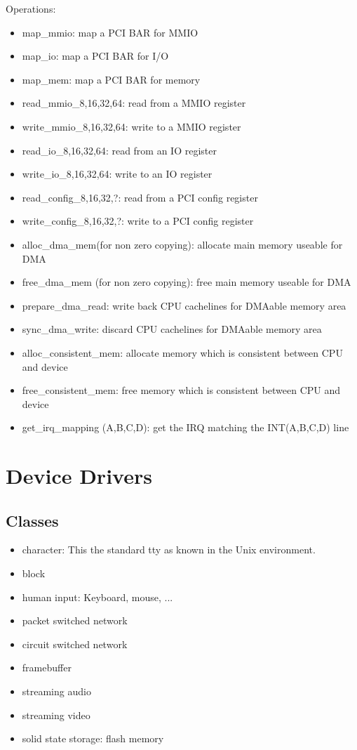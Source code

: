 Operations:
\begin{itemize}
\item map\_mmio: map a PCI BAR for MMIO
\item map\_io: map a PCI BAR for I/O
\item map\_mem: map a PCI BAR for memory
\item read\_mmio\_{8,16,32,64}: read from a MMIO register
\item write\_mmio\_{8,16,32,64}: write to a MMIO register
\item read\_io\_{8,16,32,64}: read from an IO register
\item write\_io\_{8,16,32,64}: write to an IO register
\item read\_config\_{8,16,32,?}: read from a PCI config register
\item write\_config\_{8,16,32,?}: write to a PCI config register
\item alloc\_dma\_mem(for non zero copying): allocate main memory 
  useable for DMA
\item free\_dma\_mem  (for non zero copying): free main memory 
  useable for DMA
\item prepare\_dma\_read: write back CPU cachelines for DMAable memory area
\item sync\_dma\_write: discard CPU cachelines for DMAable memory area
\item alloc\_consistent\_mem: allocate memory which is consistent 
  between CPU and device
\item free\_consistent\_mem: free memory which
  is consistent between CPU and device
\item get\_irq\_mapping (A,B,C,D): get the IRQ matching the 
  INT(A,B,C,D) line
\end{itemize}


\section{Device Drivers}

\subsection{Classes}

\begin{itemize}
\item character: This the standard tty as known in the Unix environment.
\item block
\item human input: Keyboard, mouse, ...
\item packet switched network
\item circuit switched network
\item framebuffer
\item streaming audio
\item streaming video
\item solid state storage: flash memory
\end{itemize}

